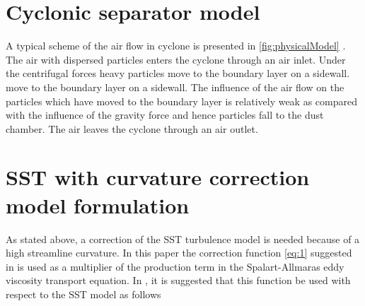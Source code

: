 \documentclass[a4paper]{jpconf}
\begin{document}
\section{Cyclonic separator model}
A typical scheme of the air flow in cyclone is presented in \cref{fig:physicalModel} \cite{instructions}. The air with dispersed particles enters the cyclone through an air inlet. Under the centrifugal forces heavy particles move to the boundary layer on a sidewall. move to the boundary layer on a sidewall. The influence of the air flow on the particles which have moved to the boundary layer is relatively weak as compared with the influence of the gravity force and hence particles fall to the dust chamber. The air leaves the cyclone through an air outlet.
\section{SST with curvature correction model formulation}
\label{sec:model}
As stated above, a correction of the SST turbulence model is needed because of a high streamline curvature. In this paper the correction function \eqref{eq:1} suggested in \citep{ShurSpallart} is used as a multiplier of the production term in the Spalart-Allmaras eddy viscosity transport equation. In \cite{Smirnov}, it is suggested 
that this function be used with respect to the SST model as follows
\end{document}
